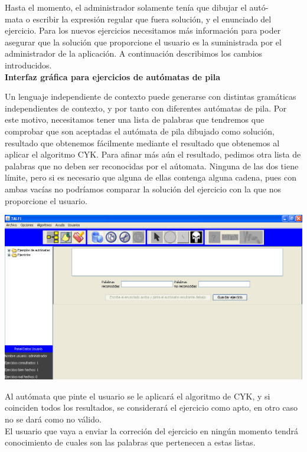 \documentclass[12pt,a4paper,spanish]{book}
\begin{document}
Hasta el momento, el administrador solamente ten\'ia que dibujar el aut\'o-\\mata o escribir la expresi\'on regular que fuera soluci\'on, y el enunciado del ejercicio. Para los nuevos ejercicios necesitamos m\'as informaci\'on para poder asegurar que la soluci\'on que proporcione el usuario es la suministrada por el administrador de la aplicaci\'on. A continuaci\'on describimos los cambios introducidos.\\

{\bf Interfaz gr\'{a}fica  para ejercicios de aut\'{o}matas de pila \\}

Un lenguaje independiente de contexto puede generarse con distintas gram\'aticas independientes de contexto, y por tanto con diferentes aut\'omatas de pila. Por este motivo, necesitamos tener una lista de palabras que tendremos que comprobar que son aceptadas el aut\'omata de pila dibujado como soluci\'on, resultado que obtenemos f\'acilmente mediante el resultado que obtenemos al aplicar el algoritmo CYK. Para afinar m\'as a\'un el resultado, pedimos otra lista de palabras que no deben ser reconocidas por el a\'utomata. Ninguna de las dos tiene l\'imite, pero si es necesario que alguna de ellas contenga alguna cadena, pues con ambas vac\'ias no podr\'iamos comparar la soluci\'on del ejercicio con la que nos proporcione el usuario.

\begin{center}
\includegraphics[width=\textwidth]{crearejpila.jpg}
\end{center}
Al aut\'omata que pinte el usuario se le aplicar\'a el algoritmo de CYK, y si coinciden todos los resultados, se considerar\'a el ejercicio como apto, en otro caso no se dar\'a como no v\'alido.\\
\newline \newline \newline \newline \newline
El usuario que vaya a enviar la correci\'on del ejercicio en ning\'un momento tendr\'a conocimiento de cuales son las palabras que pertenecen a estas listas.\\
\end{document}
